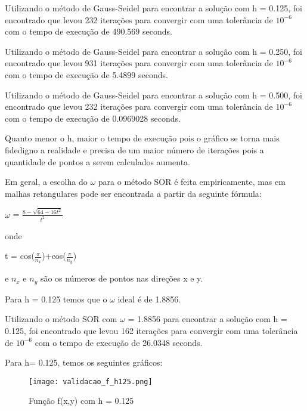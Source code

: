 \documentclass[
12pt,				%
oneside,			%
a4paper,			%
english,			%
french,				%
spanish,			%
brazil				%
]{abntex2}
\begin{document}
Utilizando o  método de Gauss-Seidel para encontrar a solução com h = 0.125, foi encontrado que levou 232 iterações para convergir com uma tolerância de $10^{-6}$ com  o tempo de execução de 490.569 seconds.

Utilizando o  método de Gauss-Seidel para encontrar a solução com h = 0.250, foi encontrado que levou 931 iterações para convergir com uma tolerância de $10^{-6}$ com o tempo de execução de 5.4899 seconds.

Utilizando o  método de Gauss-Seidel para encontrar a solução com h = 0.500, foi encontrado que levou 232 iterações para convergir com uma tolerância de $10^{-6}$ com o tempo de execução de 0.0969028 seconds.

Quanto menor o h, maior o tempo de execução pois o gráfico se torna mais fidedigno a realidade e precisa de um maior número de iterações pois a quantidade de pontos a serem calculados aumenta.

Em geral, a escolha do $\omega$ para o método SOR é feita empiricamente, mas em malhas retangulares pode ser encontrada a partir da seguinte fórmula:

\begin{center}$\omega$ =  $\frac{8-\sqrt{64-16t^2}}{t^2}$\end{center}

onde

\begin{center}t = cos($\frac{\pi}{n_x}$)+cos($\frac{\pi}{n_y}$)\end{center}

e $n_x$ e $n_y$ são os números de pontos nas direções x e y.

Para h = 0.125 temos que o $\omega$ ideal é de 1.8856.

Utilizando o  método SOR com $\omega$ = 1.8856 para encontrar a solução com h = 0.125, foi encontrado que levou 162 iterações para convergir com uma tolerância de $10^{-6}$ com  o tempo de execução de 26.0348 seconds.




\newpage




Para h= 0.125, temos os seguintes gráficos:

\begin{figure}[H]
	\begin{center}
		\texttt{[image: validacao\_f\_h125.png]}
		\caption{Função f(x,y) com h = 0.125}
		\label{fluxograma}
	\end{center}
\end{figure}
\end{document}
